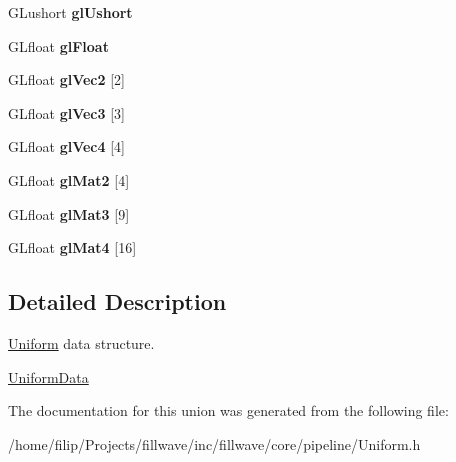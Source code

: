 \begin{DoxyCompactItemize}
\item 
\hypertarget{unionfillwave_1_1core_1_1UniformData_a2f34091b38db5b0007ab3d251d7ad332}{}G\+Lushort {\bfseries gl\+Ushort}\label{unionfillwave_1_1core_1_1UniformData_a2f34091b38db5b0007ab3d251d7ad332}

\item 
\hypertarget{unionfillwave_1_1core_1_1UniformData_ac3aea1ae639c8bbde6ac23e1cb853838}{}G\+Lfloat {\bfseries gl\+Float}\label{unionfillwave_1_1core_1_1UniformData_ac3aea1ae639c8bbde6ac23e1cb853838}

\item 
\hypertarget{unionfillwave_1_1core_1_1UniformData_af37db84b5aae6d18412e17753bdcdac8}{}G\+Lfloat {\bfseries gl\+Vec2} \mbox{[}2\mbox{]}\label{unionfillwave_1_1core_1_1UniformData_af37db84b5aae6d18412e17753bdcdac8}

\item 
\hypertarget{unionfillwave_1_1core_1_1UniformData_aa7c5ee22e56803c38e859aaa50f7ee82}{}G\+Lfloat {\bfseries gl\+Vec3} \mbox{[}3\mbox{]}\label{unionfillwave_1_1core_1_1UniformData_aa7c5ee22e56803c38e859aaa50f7ee82}

\item 
\hypertarget{unionfillwave_1_1core_1_1UniformData_a32975f1f2fd724494781ea82f3ae841f}{}G\+Lfloat {\bfseries gl\+Vec4} \mbox{[}4\mbox{]}\label{unionfillwave_1_1core_1_1UniformData_a32975f1f2fd724494781ea82f3ae841f}

\item 
\hypertarget{unionfillwave_1_1core_1_1UniformData_a04da27edcc453524dc6888973859b05f}{}G\+Lfloat {\bfseries gl\+Mat2} \mbox{[}4\mbox{]}\label{unionfillwave_1_1core_1_1UniformData_a04da27edcc453524dc6888973859b05f}

\item 
\hypertarget{unionfillwave_1_1core_1_1UniformData_a585506adf37eb7c393f8845030eb3bfd}{}G\+Lfloat {\bfseries gl\+Mat3} \mbox{[}9\mbox{]}\label{unionfillwave_1_1core_1_1UniformData_a585506adf37eb7c393f8845030eb3bfd}

\item 
\hypertarget{unionfillwave_1_1core_1_1UniformData_a9ea2178936e9d77e8808a608e62be14b}{}G\+Lfloat {\bfseries gl\+Mat4} \mbox{[}16\mbox{]}\label{unionfillwave_1_1core_1_1UniformData_a9ea2178936e9d77e8808a608e62be14b}

\end{DoxyCompactItemize}


\subsection{Detailed Description}
\hyperlink{classfillwave_1_1core_1_1Uniform}{Uniform} data structure. 

\hyperlink{unionfillwave_1_1core_1_1UniformData}{Uniform\+Data} 

The documentation for this union was generated from the following file\+:\begin{DoxyCompactItemize}
\item 
/home/filip/\+Projects/fillwave/inc/fillwave/core/pipeline/Uniform.\+h\end{DoxyCompactItemize}
